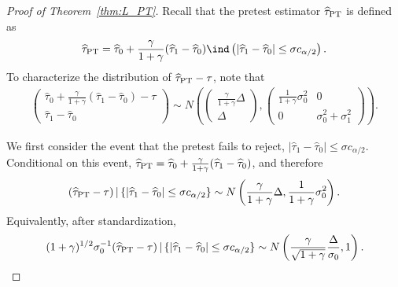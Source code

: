 \documentclass[11pt]{article}
\def\given{\,|\,}
\newcommand{\htau}{\widehat\tau}
\numberwithin{equation}{section}
\theoremstyle{definition}
\begin{document}
\begin{proof}[Proof of Theorem~\ref{thm:L_PT}]
Recall that the pretest estimator $\htau_{\rm PT}$ is defined as
\[
  \htau_{\rm PT} = \htau_0 + \frac{\gamma}{1+\gamma} (\htau_1 - \htau_0) \ind\left(\lvert \htau_1 - \htau_0 \rvert \le \sigma c_{\alpha/2}\right).
\]
To characterize the distribution of $\htau_{\rm PT} - \tau$, note that
\begin{align*}
  \begin{pmatrix} \htau_0 + \frac{\gamma}{1+\gamma} (\htau_1-\htau_0)-\tau \\ \htau_1-\htau_0 \end{pmatrix} \sim N\left(\begin{pmatrix} \frac{\gamma}{1+\gamma} \Delta \\ \Delta\end{pmatrix}, \begin{pmatrix} \frac{1}{1+\gamma} \sigma_0^2 & 0 \\
  0 & \sigma_0^2 + \sigma_1^2
  \end{pmatrix}\right).
\end{align*}

We first consider the event that the pretest fails to reject, $\lvert \htau_1 - \htau_0 \rvert \le \sigma c_{\alpha/2}$. Conditional on this event, $\htau_{\rm PT} = \htau_0 + \frac{\gamma}{1+\gamma} (\htau_1 - \htau_0)$, and therefore
\begin{align*}
  (\htau_{\rm PT} - \tau) \given \{\lvert \htau_1 - \htau_0 \rvert \le \sigma c_{\alpha/2}\} \sim N\left(\frac{\gamma}{1+\gamma} \Delta, \frac{1}{1+\gamma} \sigma_0^2\right).
\end{align*}
Equivalently, after standardization,
\begin{align*}
  (1+\gamma)^{1/2} \sigma_0^{-1} (\htau_{\rm PT} - \tau) \given \{\lvert \htau_1 - \htau_0 \rvert \le \sigma c_{\alpha/2}\} \sim N\left(\frac{\gamma}{\sqrt{1+\gamma}} \frac{\Delta}{\sigma_0}, 1\right).
\end{align*}


\end{proof}
\end{document}

